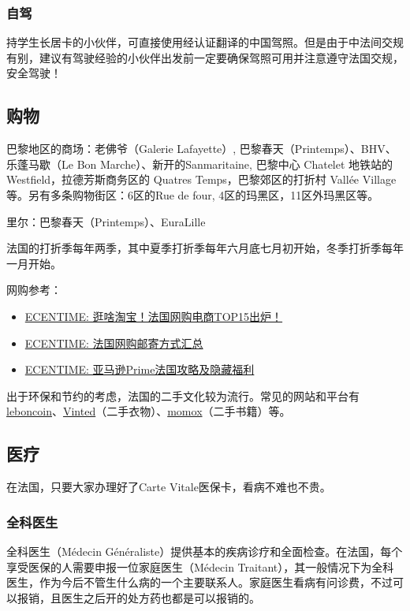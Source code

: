 \documentclass[UTF8]{ctexart}
\begin{document}
\subsubsection{自驾}
持学⽣长居卡的⼩伙伴，可直接使用经认证翻译的中国驾照。但是由于中法间交规有别，建议有驾驶经验的⼩伙伴出发前⼀定要确保驾照可用并注意遵守法国交规，安全驾驶！

\subsection{购物}
	
巴黎地区的商场：老佛爷（Galerie Lafayette）, 巴黎春天（Printemps）、BHV、乐蓬马歇（Le Bon Marche）、新开的Sanmaritaine, 巴黎中心 Chatelet 地铁站的Westfield，拉德芳斯商务区的 Quatres Temps，巴黎郊区的打折村 Vallée Village等。另有多条购物街区：6区的Rue de four, 4区的玛黑区，11区外玛黑区等。

里尔：巴黎春天（Printemps）、EuraLille

法国的打折季每年两季，其中夏季打折季每年六月底七月初开始，冬季打折季每年一月开始。

网购参考：
\begin{itemize}
    \item \href{https://www.ecentime.com/article/ecommerce-fr-top15}{ECENTIME: 逛啥淘宝！法国网购电商TOP15出炉！}
    \item \href{https://www.ecentime.com/article/online-shopping-delivery}{ECENTIME: 法国网购邮寄方式汇总}
    \item \href{https://www.ecentime.com/article/amazon-fr-skill-1}{ECENTIME: 亚马逊Prime法国攻略及隐藏福利}
\end{itemize}

出于环保和节约的考虑，法国的二手文化较为流行。常见的网站和平台有\href{https://www.leboncoin.fr/}{leboncoin}、\href{https://www.vinted.fr/}{Vinted}（二手衣物）、\href{https://www.momox-shop.fr/}{momox}（二手书籍）等。


\subsection{医疗}

在法国，只要大家办理好了Carte Vitale医保卡，看病不难也不贵。

\subsubsection{全科医生}	
全科医生（Médecin Généraliste）提供基本的疾病诊疗和全面检查。在法国，每个享受医保的人需要申报一位家庭医生（Médecin Traitant），其一般情况下为全科医生，作为今后不管生什么病的一个主要联系人。家庭医生看病有问诊费，不过可以报销，且医生之后开的处方药也都是可以报销的。
\end{document}
